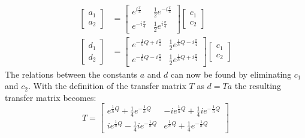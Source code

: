 		\begin{align}
			\left[\begin{array}{cc}
				a_{1}\\
				a_{2}
			\end{array}\right]
			&=
			\left[\begin{array}{cc}
				e^{i\frac{\pi}{4}} & \frac{1}{2}e^{-i\frac{\pi}{4}}\\
				e^{-i\frac{\pi}{4}} & \frac{1}{2}e^{i\frac{\pi}{4}}
			\end{array}\right]
			\left[\begin{array}{cc}
				c_{1}\\
				c_{2}
			\end{array}\right]\\
			\left[\begin{array}{cc}
				d_{1}\\
				d_{2}
			\end{array}\right]
			&=
			\left[\begin{array}{cc}
				e^{-\frac{1}{h}Q+i\frac{\pi}{4}} & \frac{1}{2}e^{\frac{1}{h}Q-i\frac{\pi}{4}}\\
				e^{-\frac{1}{h}Q-i\frac{\pi}{4}} & \frac{1}{2}e^{\frac{1}{h}Q+i\frac{\pi}{4}}
			\end{array}\right]
			\left[\begin{array}{cc}
				c_{1}\\
				c_{2}
			\end{array}\right]
		\end{align}
		The relations between the constants $a$ and $d$ can now be found by eliminating $c_{1}$ and $c_{2}$. With the definition of the transfer matrix $T$ as $d=Ta$ the resulting transfer matrix becomes:
		\begin{equation}
			T=
			\left[\begin{array}{cc}
				e^{\frac{1}{h}Q}+\frac{1}{4}e^{-\frac{1}{h}Q} & -ie^{\frac{1}{h}Q}+\frac{1}{4}ie^{-\frac{1}{h}Q}\\
				ie^{\frac{1}{h}Q}-\frac{1}{4}ie^{-\frac{1}{h}Q} & e^{\frac{1}{h}Q}+\frac{1}{4}e^{-\frac{1}{h}Q}
			\end{array}\right]
		\end{equation}
